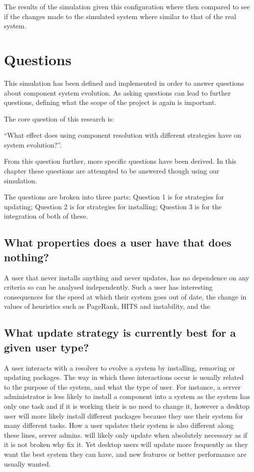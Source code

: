 The results of the simulation given this configuration where then compared to see if the changes made to the simulated system where similar to that of the real system.

\section{Questions}
This simulation has been defined and implemented in order to answer questions about component system evolution.
As asking questions can lead to further questions, defining what the scope of the project is again is important.

The core question of this research is:

``What effect does using component resolution with different strategies have on system evolution?''.

From this question further, more specific questions have been derived.
In this chapter these questions are attempted to be answered though using our simulation.

The questions are broken into three parts; Question 1 is for strategies for updating; Question 2 is for strategies for installing; Question 3 is for the integration of both of these.

\subsection{What properties does a user have that does nothing?}
{}A user that never installs anything and never updates, has no dependence on any criteria so can be analysed independently.
{}Such a user has interesting consequences for the speed at which their system goes out of date, the change in values of heuristics such as PageRank, HITS and instability,
{}and the 

\subsection{What update strategy is currently best for a given user type?}
A user interacts with a resolver to evolve a system by installing, removing or updating packages.
The way in which these interactions occur is usually related to the purpose of the system, and what the type of user.
For instance, a server administrator is less likely to install a component into a system as the system has only one task and if it is working their is no need to change it, 
however a desktop user will more likely install different packages because they use their system for many different tasks.
How a user updates their system is also different along these lines, server admins. will likely only update when absolutely necessary as if it is not broken why fix it.
Yet desktop users will update more frequently as they want the best system they can have, and new features or better performance are usually wanted.


